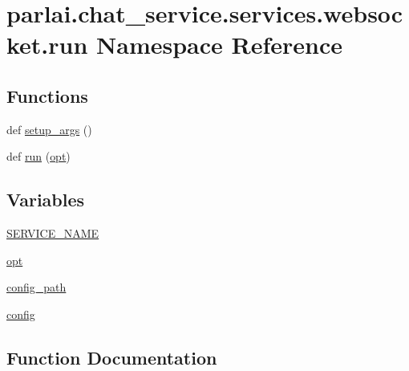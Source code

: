 \hypertarget{namespaceparlai_1_1chat__service_1_1services_1_1websocket_1_1run}{}\section{parlai.\+chat\+\_\+service.\+services.\+websocket.\+run Namespace Reference}
\label{namespaceparlai_1_1chat__service_1_1services_1_1websocket_1_1run}
\subsection*{Functions}
\begin{DoxyCompactItemize}
\item 
def \hyperlink{namespaceparlai_1_1chat__service_1_1services_1_1websocket_1_1run_a3335f62a1f0f68151449b8ecef1d9908}{setup\+\_\+args} ()
\item 
def \hyperlink{namespaceparlai_1_1chat__service_1_1services_1_1websocket_1_1run_aa7edf5a6148ae51bad84b084237002fe}{run} (\hyperlink{namespaceparlai_1_1chat__service_1_1services_1_1websocket_1_1run_a94e683b5c015e99fdf975fce2594835e}{opt})
\end{DoxyCompactItemize}
\subsection*{Variables}
\begin{DoxyCompactItemize}
\item 
\hyperlink{namespaceparlai_1_1chat__service_1_1services_1_1websocket_1_1run_ab354414d22195c0db342ab24a6e5f4ae}{S\+E\+R\+V\+I\+C\+E\+\_\+\+N\+A\+ME}
\item 
\hyperlink{namespaceparlai_1_1chat__service_1_1services_1_1websocket_1_1run_a94e683b5c015e99fdf975fce2594835e}{opt}
\item 
\hyperlink{namespaceparlai_1_1chat__service_1_1services_1_1websocket_1_1run_aaee8669d70752161a2cf0945d6b9f161}{config\+\_\+path}
\item 
\hyperlink{namespaceparlai_1_1chat__service_1_1services_1_1websocket_1_1run_ac583a14d08de85e9c7be6267d13b1a91}{config}
\end{DoxyCompactItemize}


\subsection{Function Documentation}
\mbox{\label{namespaceparlai_1_1chat__service_1_1services_1_1websocket_1_1run_aa7edf5a6148ae51bad84b084237002fe}} 
